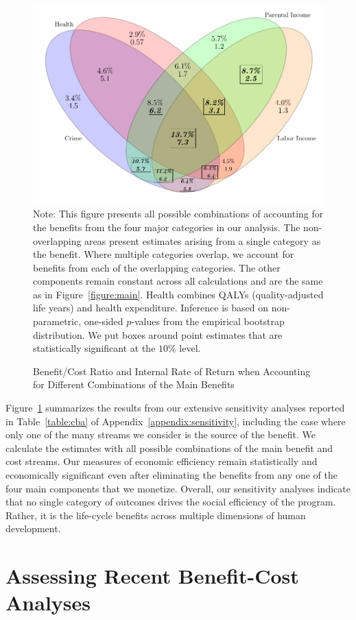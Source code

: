 \begin{figure}[htpb!]
\caption{Benefit/Cost Ratio and Internal Rate of Return when Accounting for Different Combinations of the Main Benefits}\label{figure:vennpooled}
\centering
\includegraphics[width=.7\columnwidth]{output/venn_pooled.pdf}
\footnotesize \justify
Note: This figure presents all possible combinations of accounting for the benefits from the four major categories in our analysis. The non-overlapping areas present estimates arising from a single category as the benefit. Where multiple categories overlap, we account for benefits from each of the overlapping categories. The other components remain constant across all calculations and are the same as in Figure~\ref{figure:main}. Health combines QALYs (quality-adjusted life years) and health expenditure. Inference is based on non-parametric, one-sided $p$-values from the empirical bootstrap distribution. We put boxes around point estimates that are statistically significant at the $10\%$ level.
\end{figure}

Figure~\ref{figure:vennpooled} summarizes the results from our extensive sensitivity analyses reported in Table~\ref{table:cba} of Appendix~\ref{appendix:sensitivity}, including the case where only one of the many streams we consider is the source of the benefit. We calculate the estimates with all possible combinations of the main benefit and cost streams. Our measures of economic efficiency remain statistically and economically significant even after eliminating the benefits from any one of the four main components that we monetize.  Overall, our sensitivity analyses indicate that no single category of outcomes drives the social efficiency of the program. Rather, it is the life-cycle benefits across multiple dimensions of human development.

\section{Assessing Recent Benefit-Cost Analyses} \label{section:bcaestimates}

